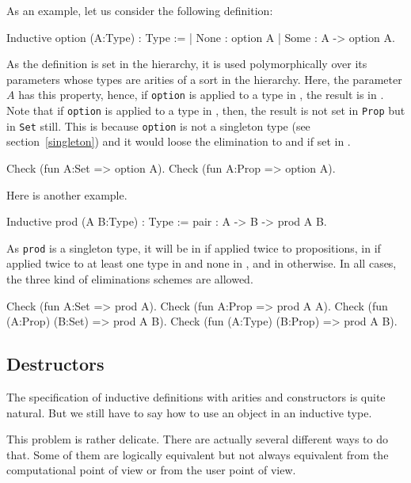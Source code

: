 As an example, let us consider the following definition:
\begin{coq_example*}
Inductive option (A:Type) : Type := 
| None : option A 
| Some : A -> option A.
\end{coq_example*}

As the definition is set in the {\Type} hierarchy, it is used
polymorphically over its parameters whose types are arities of a sort
in the {\Type} hierarchy. Here, the parameter $A$ has this property,
hence, if \texttt{option} is applied to a type in {\Set}, the result is
in {\Set}. Note that if \texttt{option} is applied to a type in {\Prop},
then, the result is not set in \texttt{Prop} but in \texttt{Set}
still. This is because \texttt{option} is not a singleton type (see
section~\ref{singleton}) and it would loose the elimination to {\Set} and
{\Type} if set in {\Prop}.

\begin{coq_example}
Check (fun A:Set => option A).
Check (fun A:Prop => option A).
\end{coq_example}

Here is another example.

\begin{coq_example*}
Inductive prod (A B:Type) : Type := pair : A -> B -> prod A B.
\end{coq_example*}

As \texttt{prod} is a singleton type, it will be in {\Prop} if applied
twice to propositions, in {\Set} if applied twice to at least one type
in {\Set} and none in {\Type}, and in {\Type} otherwise. In all cases,
the three kind of eliminations schemes are allowed.

\begin{coq_example}
Check (fun A:Set => prod A).
Check (fun A:Prop => prod A A).
Check (fun (A:Prop) (B:Set) => prod A B).
Check (fun (A:Type) (B:Prop) => prod A B).
\end{coq_example}

\subsection{Destructors}
The specification of inductive definitions with arities and
constructors is quite natural.  But we still have to say how to use an
object in an inductive type.

This problem is rather delicate. There are actually several different
ways to do that. Some of them are logically equivalent but not always
equivalent from the computational point of view or from the user point
of view.

